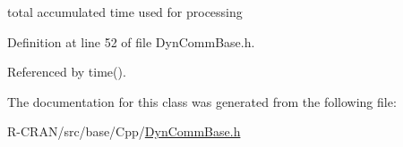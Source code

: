 total accumulated time used for processing 

Definition at line 52 of file Dyn\+Comm\+Base.\+h.



Referenced by time().



The documentation for this class was generated from the following file\+:\begin{DoxyCompactItemize}
\item 
R-\/\+C\+R\+A\+N/src/base/\+Cpp/\hyperlink{DynCommBase_8h}{Dyn\+Comm\+Base.\+h}\end{DoxyCompactItemize}
